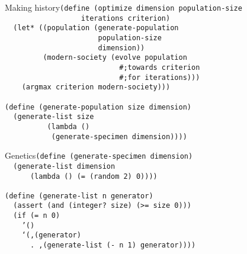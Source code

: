 \documentclass{beamer}
\begin{document}
\begin{frame}{Making history}\texttt{(define (optimize dimension population-size\\
\ \ \ \ \ \ \ \ \ \ \ \ \ \ \ \ \ \ iterations criterion)\\ \pause
\ \ (let* ((population (generate-population \\
\ \ \ \ \ \ \ \ \ \ \ \ \ \ \ \ \ \ \ \ \ \ population-size \\
\ \ \ \ \ \ \ \ \ \ \ \ \ \ \ \ \ \ \ \ \ \ dimension))\\ \pause
\ \ \ \ \ \ \ \ \ (modern-society (evolve population \\
\ \ \ \ \ \ \ \ \ \ \ \ \ \ \ \ \ \ \ \ \ \ \ \ \ \ \
\#;towards criterion \\
\ \ \ \ \ \ \ \ \ \ \ \ \ \ \ \ \ \ \ \ \ \ \ \ \ \ \
\#;for iterations))) \\ \pause
\ \ \ \ (argmax criterion modern-society)))\\ \pause
\ \\
(define (generate-population size dimension)\\ \pause
\ \ (generate-list size \\
\ \ \ \ \ \ \ \ \ \ (lambda ()\\
\ \ \ \ \ \ \ \ \ \ \ (generate-specimen dimension))))
}
\end{frame}


\begin{frame}{Genetics}\texttt{(define (generate-specimen dimension)\\ \pause
\ \ (generate-list dimension \\
\ \ \ \ \ \  (lambda () (= (random 2) 0))))\\ \pause
\ \\
(define (generate-list n generator)\\ \pause
\ \ (assert (and (integer? size) (>= size 0)))\\ \pause
\ \ (if (= n 0)\\
\ \ \ \ '()\\ \pause
\ \ \ \ `(,(generator)\\
\ \ \ \ \ \ . ,(generate-list (- n 1) generator))))
}
\end{frame}
\end{document}
